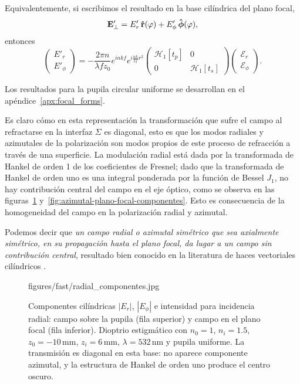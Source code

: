 Equivalentemente, si escribimos el resultado en la base cilíndrica del plano focal,
\begin{equation}
  \vb E'_\perp
  =
  E'_r\,\bm{\hat{\mathbf{r}}}(\varphi)
  +
  E'_\phi\,\bm{\hat{\mathbf{\phi}}}(\varphi),
\end{equation}
entonces
\begin{equation}
\boxed{
\begin{pmatrix}
E'_r\\
E'_\phi
\end{pmatrix}
=
-\frac{2\pi n}{\lambda f z_0}
e^{inkf}
e^{i\frac{nk}{2f}r^2}
\begin{pmatrix}
\mathscr H_1[t_p] & 0\\
0 & \mathscr H_1[t_s]
\end{pmatrix}
\begin{pmatrix}
\mathscr E_r\\
\mathscr E_\phi
\end{pmatrix}.
}
\label{eq:E_cylindrical_Hankel_matrix}
\end{equation}

Los resultados para la pupila circular uniforme se desarrollan en el apéndice~\ref{apx:focal_forms}.

Es claro cómo en esta representación la transformación que sufre el campo al refractarse en la interfaz $\Sigma$ es diagonal, esto es que los modos radiales y azimutales de la polarización son modos propios de este proceso de refracción a través de una superficie. La modulación radial está dada por la transformada de Hankel de orden 1 de los coeficientes de Fresnel; dado que la transformada de Hankel de orden uno es una integral ponderada por la función de Bessel $J_1$, no hay contribución central del campo en el eje óptico, como se observa en las figuras~\ref{fig:radial-plano-focal-componentes} y~\ref{fig:azimutal-plano-focal-componentes}. Esto es consecuencia de la homogeneidad del campo en la polarización radial y azimutal.

Podemos decir que \textit{un campo radial o azimutal simétrico que sea axialmente simétrico, en su propagación hasta el plano focal, da lugar a un campo sin contribución central}, resultado bien conocido en la literatura de haces vectoriales cilíndricos \cite{Youngworth2000, Zhan2009}.

\begin{figure}[H]
  \centering
    {figures/fast/radial_componentes.jpg}
  \caption{Componentes cilíndricas $|E_r|$, $|E_\phi|$ e intensidad para incidencia radial: campo sobre la pupila (fila superior) y campo en el plano focal (fila inferior). Dioptrio estigmático con $n_0=1$, $n_i=1.5$, $z_0=-10\,\mathrm{mm}$, $z_i=6\,\mathrm{mm}$, $\lambda=532\,\mathrm{nm}$ y pupila uniforme. La transmisión es diagonal en esta base: no aparece componente azimutal, y la estructura de Hankel de orden uno produce el centro oscuro.}
  \label{fig:radial-plano-focal-componentes}
\end{figure}

